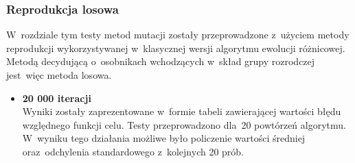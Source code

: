 
\subsubsection{Reprodukcja losowa}
W~rozdziale tym testy metod mutacji zostały przeprowadzone z~użyciem metody reprodukcji wykorzystywanej w~klasycznej wersji algorytmu ewolucji różnicowej. Metodą decydującą o~osobnikach wchodzących w~skład grupy rozrodczej jest~więc metoda losowa.\\
\par

\begin{itemize}
\item  \textbf{20 000 iteracji}\\

Wyniki zostały zaprezentowane w~formie tabeli zawierającej wartości błędu względnego funkcji celu. Testy przeprowadzono dla~20 powtórzeń algorytmu. W~wyniku tego działania możliwe było policzenie wartości średniej oraz~odchylenia standardowego z~kolejnych 20 prób.


\end{itemize}
